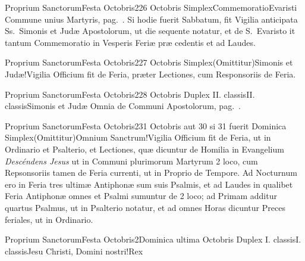 \documentclass[liber-responsorialis.tex]{subfiles}
\begin{document}
	{Proprium Sanctorum}{Festa Octobris}{2}{26 Octobris}
	{Simplex}{Commemoratio}{Evaristi}
	{Commune unius Martyris, pag.\ \pageref{M-UMEX}. Si hodie fuerit Sabbatum, fit Vigilia anticipata Ss.\ Simonis et Judæ Apostolorum, ut die sequente notatur, et de S.\ Evaristo it tantum Commemoratio in Vesperis Feriæ præ cedentis et ad Laudes.}
	{}

	{Proprium Sanctorum}{Festa Octobris}{2}{27 Octobris}
	{Simplex}{(Omittitur)}{Simonis et Judæ!Vigilia}
	{Officium fit de Feria, præter Lectiones, cum Responsoriis de Feria.}
	{}

	{Proprium Sanctorum}{Festa Octobris}{2}{28 Octobris}
	{Duplex II. classis}{II. classis}{Simonis et Judæ}
	{Omnia de Communi Apostolorum, pag.\ \pageref{M-APEX}.}
	{}

	{Proprium Sanctorum}{Festa Octobris}{2}{31 Octobris aut 30 si 31 fuerit Dominica}
	{Simplex}{(Omittitur)}{Omnium Sanctrum!Vigilia}
	{Officium fit de Feria, ut in Ordinario et Psalterio, et Lectiones, quæ dicuntur de Homilia in Evangelium \emph{Descéndens Jesus} ut in Communi plurimorum Martyrum 2 loco, cum Repsonsoriis tamen de Feria currenti, ut in Proprio de Tempore. Ad Nocturnum ero in Feria  tres ultimæ Antiphonæ sum suis Psalmis, et ad Laudes in qualibet Feria Antiphonæ omnes et Psalmi sumuntur de 2 loco; ad Primam additur quartus Psalmus, ut in Psalterio notatur, et ad omnes Horas dicuntur Preces feriales, ut in Ordinario.}
	{}

	{Proprium Sanctorum}{Festa Octobris}{2}{Dominica ultima Octobris}
	{Duplex I. classis}{I. classis}{Jesu Christi, Domini nostri!Rex}
	{}
	{}
\tedeumrubric
\end{document}
